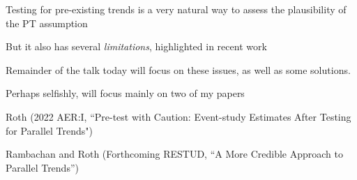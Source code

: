 \documentclass[aspectratio = 169, 13pt]{beamer}
\begin{document}
\begin{frame}
	
	\begin{wideitemize}
		
		\item
		Testing for pre-existing trends is a very natural way to assess the plausibility of the PT assumption
		
		\item
		But it also has several \textit{limitations}, highlighted in recent work \citep[][]{freyaldenhoven_pre-event_2019, kahn-lang_promise_2020, bilinski_seeking_2018, roth_pre-test_2021}
		
		\item
		Remainder of the talk today will focus on these issues, as well as some solutions. 
		
		\item
		Perhaps selfishly, will focus mainly on two of my papers
		
		\begin{wideitemize}
			\item
			Roth (2022 AER:I, ``Pre-test with Caution: Event-study Estimates After Testing for Parallel Trends") 
			\item
			Rambachan and Roth (Forthcoming RESTUD, ``A More Credible Approach to Parallel Trends'') 
		\end{wideitemize}
		
		
	\end{wideitemize}
	
	
\end{frame}
\end{document}
